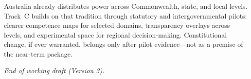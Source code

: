 \documentclass[11pt,a4paper]{article}
\begin{document}
Australia already distributes power across Commonwealth, state, and local levels. Track~C builds on that tradition through statutory and intergovernmental pilots: clearer competence maps for selected domains, transparency overlays across levels, and experimental space for regional decision-making. Constitutional change, if ever warranted, belongs only after pilot evidence---not as a premise of the near-term package.

\vspace{1.5em}
\begin{center}
\textit{End of working draft (Version 3).}
\end{center}
\end{document}

